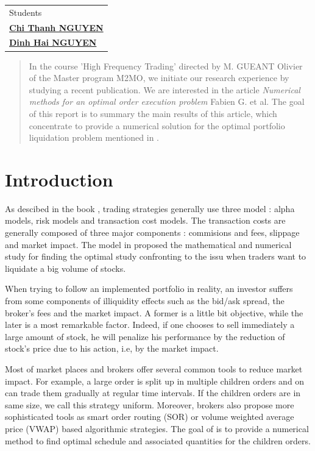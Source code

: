 \documentclass[a4paper,10pt]{article}
\begin{document}
\begin{titlepage}
\begin{tabular}{l}
Students                                                                          \\ 
\href{mailto:chithanhnguyen.math@gmail.com}{\LARGE{\textbf{Chi Thanh NGUYEN}}}    \\
\href{mailto:ndhai1905@gmail.com}{\LARGE{\textbf{Dinh Hai NGUYEN}}}
\end{tabular}

\vfill
\begin{abstract}
In the course 'High Frequency Trading' directed by M. GUEANT Olivier of the Master program M2MO, we initiate our research experience by studying a recent publication. We are interested in the article \textit{ Numerical methods for an optimal order execution problem} Fabien G. et al. The goal of this report is to summary the main results of this article, which concentrate to provide a numerical solution for the optimal portfolio liquidation problem mentioned in \cite{KP}. 
\end{abstract}
\end{titlepage}

\newpage
{}

\section{Introduction}
\par As descibed in the book \cite{NARANG}, trading strategies generally use three model : alpha models, risk models and transaction cost models. The transaction costs are generally composed of three major components : commisions and fees, slippage and market impact. The model in \cite{KP} \cite{GMP} proposed the mathematical and numerical study for finding the optimal study confronting to the issu when traders want to liquidate a big volume of stocks.      

\par When trying to follow an implemented portfolio in reality, an investor suffers from some components of illiquidity effects such as the bid/ask spread, the broker's fees and the market impact. A former is a little bit objective, while the later is a most remarkable factor. Indeed, if one chooses to sell immediately a large amount of stock, he will penalize his performance by the reduction of stock’s price due to his action, i.e, by the market impact. 

\par Most of market places and brokers offer several common tools to reduce market impact. For example, a large order is split up in multiple children orders and on can trade them gradually at regular time intervals. If the children orders are in same size, we call this strategy uniform. Moreover, brokers also propose more sophisticated tools as smart order routing (SOR) or volume weighted average price (VWAP) based algorithmic strategies. The goal of \cite{GMP} is to provide a numerical method to find optimal schedule and associated quantities for the children orders. 
\end{document}
